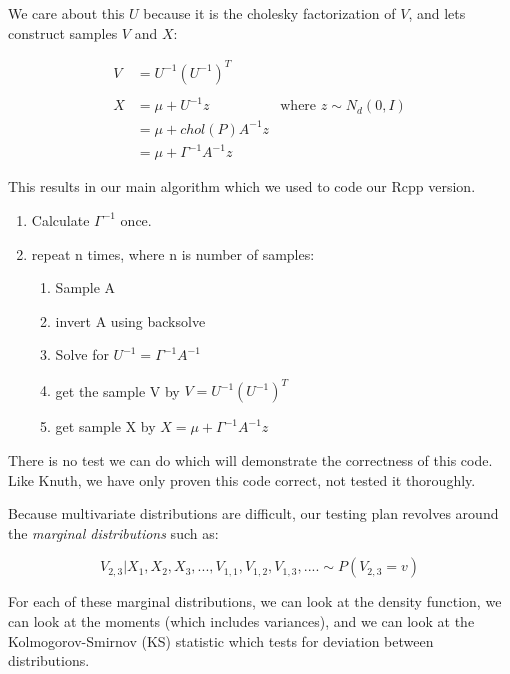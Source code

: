 \documentclass[english]{report}
\begin{document}
We care about this $U$ because it is the cholesky factorization of $V$, and lets construct samples $V$ and $X$:

\begin{align*}
V & =U^{-1}\left(U^{-1}\right)^{T}\\
\\
X & =\mu+U^{-1}z & \text{where }z\sim N_{d}(0,I)\\
 & =\mu+chol(P)A^{-1}z\\
 & =\mu+\Gamma^{-1}A^{-1}z
\end{align*}

This results in our main algorithm which we used to code our Rcpp version.

\begin{enumerate}
\item Calculate $\Gamma^{-1}$ once.
\item repeat n times, where n is number of samples:
\begin{enumerate}
		\item Sample A
		\item invert A using backsolve
		\item Solve for $U^{-1} = \Gamma^{-1}A^{-1}$\\
		\item get the sample V by $V = U^{-1}\left(U^{-1}\right)^{T}$\\
		\item get sample X by $X = \mu+\Gamma^{-1}A^{-1}z$
\end{enumerate}

\end{enumerate}




There is no test we can do which will demonstrate the correctness of this code.
Like Knuth, we have only proven this code correct, not tested it thoroughly.

Because multivariate distributions are difficult, our testing plan revolves around the \emph{marginal distributions} such as:

$$ V_{2,3} | X_1, X_2, X_3, ..., V_{1,1}, V_{1,2}, V_{1,3} , ....  \sim P(V_{2,3} = v) $$

For each of these marginal distributions, we can look at the density function, we can look at the moments (which includes variances), and we can look at the Kolmogorov-Smirnov (KS) statistic which tests for deviation between distributions.\\
\end{document}
